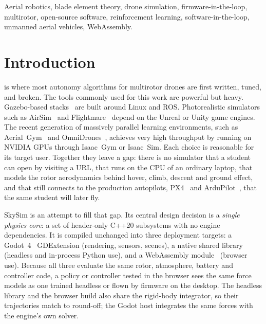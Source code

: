 \documentclass{ieeeaccess}
\newcommand{\skysim}{SkySim\xspace}
\begin{document}
\begin{keywords}
Aerial robotics, blade element theory, drone simulation, firmware-in-the-loop,
multirotor, open-source software, reinforcement learning, software-in-the-loop,
unmanned aerial vehicles, WebAssembly.
\end{keywords}

\titlepgskip=-21pt

\maketitle

\section{Introduction}
\label{sec:introduction}
 is where most autonomy algorithms for multirotor drones
are first written, tuned, and broken. The tools commonly used for this work are
powerful but heavy. Gazebo-based stacks~\cite{koenig2004gazebo,furrer2016rotors}
are built around Linux and ROS. Photorealistic simulators such as
AirSim~\cite{shah2018airsim} and Flightmare~\cite{song2020flightmare} depend on
the Unreal or Unity game engines. The recent generation of massively parallel
learning environments, such as Aerial~Gym~\cite{kulkarni2025aerialgym} and
OmniDrones~\cite{xu2024omnidrones}, achieves very high throughput by running on
NVIDIA GPUs through Isaac~Gym or Isaac~Sim. Each choice is reasonable for its
target user. Together they leave a gap: there is no simulator that a student
can open by visiting a URL, that runs on the CPU of an ordinary laptop, that
models the rotor aerodynamics behind hover, climb, descent and ground effect,
and that still connects to the production autopilots, PX4~\cite{meier2015px4}
and ArduPilot~\cite{ardupilot}, that the same student will later fly.

\skysim is an attempt to fill that gap. Its central design decision is a
\emph{single physics core}: a set of header-only C++20 subsystems with no engine
dependencies. It is compiled unchanged into three deployment targets: a
Godot~4~\cite{godot} GDExtension (rendering, sensors, scenes), a native shared
library (headless and in-process Python use), and a WebAssembly
module~\cite{haas2017wasm} (browser use). Because all three evaluate the same
rotor, atmosphere, battery and controller code, a policy or controller tested
in the browser sees the same force models as one trained headless or flown by
firmware on the desktop. The headless library and the browser build also share
the rigid-body integrator, so their trajectories match to round-off; the Godot
host integrates the same forces with the engine's own solver.
\end{document}
